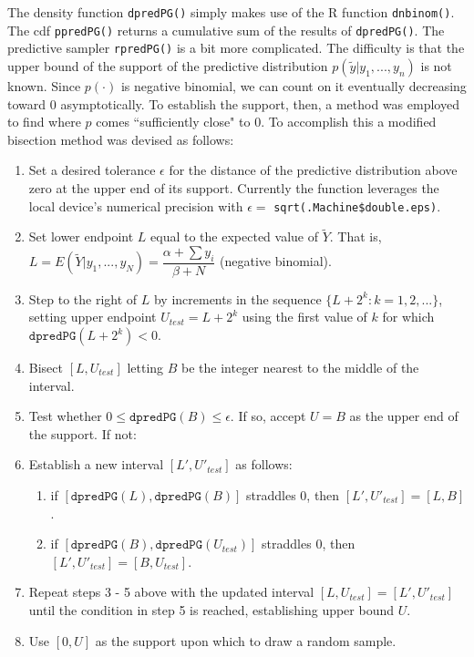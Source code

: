 \documentclass[12pt, a4paper]{article}
\begin{document}
\noindent The density function \texttt{dpredPG()} simply makes use of the R function \texttt{dnbinom()}.  The cdf \texttt{ppredPG()} returns a cumulative sum of the results of \texttt{dpredPG()}.  The predictive sampler \texttt{rpredPG()} is a bit more complicated. The difficulty is that the upper bound of the support of the predictive distribution $p(\tilde{y}|y_1,...,y_n)$ is not known.  Since $p(\cdot)$ is negative binomial, we can count on it eventually decreasing toward $0$ asymptotically.  To establish the support, then, a method was employed to find where $p$ comes ``sufficiently close" to $0$.  To accomplish this a modified bisection method was devised as follows:\\


    \begin{enumerate}
      \item Set a desired tolerance $\epsilon$ for the distance of the predictive distribution above zero at the upper end of its support.  Currently the function leverages the local device's numerical precision with $\epsilon = $ \texttt{sqrt(.Machine\$double.eps)}.
      \item Set lower endpoint $L$ equal to the expected value of $\tilde{Y}$.  That is, $L = E(\tilde{Y}|y_1,...,y_N) = \dfrac{\alpha+\sum{y_i}}{\beta+N}$ (negative binomial). %
      \item Step to the right of $L$ by increments in the sequence $\{L+2^k:k=1,2,...\}$, setting upper endpoint $U_{test} = L+2^k$ using the first value of $k$ for which $\texttt{dpredPG}\left(L + 2^k\right) < 0$.
      \item Bisect $[L,U_{test}]$ letting $B$ be the integer nearest to the middle of the interval.
      \item Test whether $0 \leq \texttt{dpredPG}(B) \leq \epsilon$.  If so, accept $U = B$ as the upper end of the support.  If not:
      \item Establish a new interval $[L',U'_{test}]$ as follows:
      \begin{enumerate}
        \item if $[\texttt{dpredPG}(L),\texttt{dpredPG}(B)]$ straddles $0$, then $[L',U'_{test}] = [L,B]$.
        \item if $[\texttt{dpredPG}(B),\texttt{dpredPG}(U_{test})]$ straddles $0$, then $[L',U'_{test}] = [B,U_{test}]$.
      \end{enumerate}
      \item Repeat steps 3 - 5 above with the updated interval $[L,U_{test}] = [L',U'_{test}]$ until the condition in step 5 is reached, establishing upper bound $U$.
      \item Use $[0,U]$ as the support upon which to draw a random sample.
    \end{enumerate}
\end{document}

